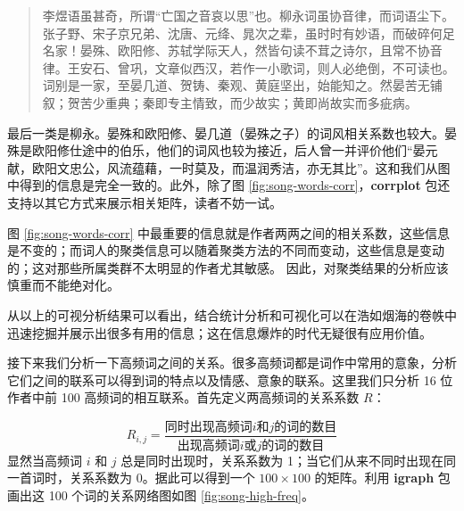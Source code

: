 \documentclass[
  b5paper,
  UTF8,twoside]{book}
\begin{document}
\begin{quote}
李煜语虽甚奇，所谓``亡国之音哀以思''也。柳永词虽协音律，而词语尘下。张子野、宋子京兄弟、沈唐、元绛、晁次之辈，虽时时有妙语，而破碎何足名家！晏殊、欧阳修、苏轼学际天人，然皆句读不茸之诗尔，且常不协音律。王安石、曾巩，文章似西汉，若作一小歌词，则人必绝倒，不可读也。词别是一家，至晏几道、贺铸、秦观、黄庭坚出，始能知之。然晏苦无铺叙；贺苦少重典；秦即专主情致，而少故实；黄即尚故实而多疵病。
\end{quote}

最后一类是柳永。晏殊和欧阳修、晏几道（晏殊之子）的词风相关系数也较大。晏殊是欧阳修仕途中的伯乐，他们的词风也较为接近，后人曾一并评价他们``晏元献，欧阳文忠公，风流蕴藉，一时莫及，而温润秀洁，亦无其比''。这和我们从图中得到的信息是完全一致的。此外，除了图 \ref{fig:song-words-corr}，\textbf{corrplot} 包还支持以其它方式来展示相关矩阵，读者不妨一试。

图 \ref{fig:song-words-corr} 中最重要的信息就是作者两两之间的相关系数，这些信息是不变的；而词人的聚类信息可以随着聚类方法的不同而变动，这些信息是变动的；这对那些所属类群不太明显的作者尤其敏感。 因此，对聚类结果的分析应该慎重而不能绝对化。

从以上的可视分析结果可以看出，结合统计分析和可视化可以在浩如烟海的卷帙中迅速挖掘并展示出很多有用的信息；这在信息爆炸的时代无疑很有应用价值。

接下来我们分析一下高频词之间的关系。很多高频词都是词作中常用的意象，分析它们之间的联系可以得到词的特点以及情感、意象的联系。这里我们只分析 16 位作者中前 100 高频词的相互联系。首先定义两高频词的关系系数 \(R\)：

\[R_{i,j}=\frac{\mbox{同时出现高频词}i\mbox{和}{j}\mbox{的词的数目}}{\mbox{出现高频词}i\mbox{或}j\mbox{的词的数目}}\]
显然当高频词 \(i\) 和 \(j\) 总是同时出现时，关系系数为 1；当它们从来不同时出现在同一首词时，关系系数为 0。据此可以得到一个 \(100\times100\) 的矩阵。利用 \textbf{igraph} 包 \citep{igraph} 画出这 100 个词的关系网络图如图 \ref{fig:song-high-freq}。
\end{document}
